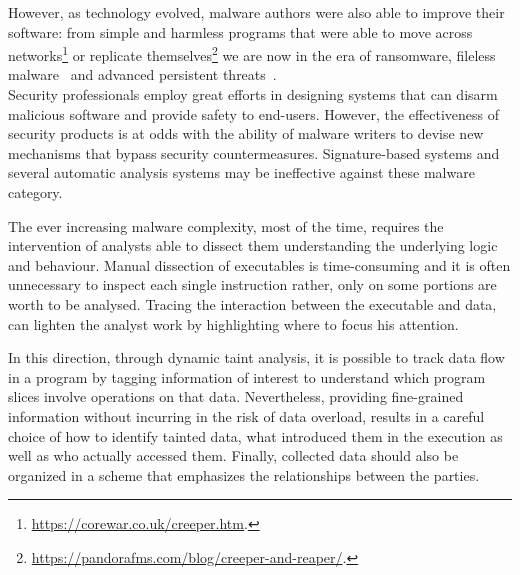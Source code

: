 \documentclass[LaM,binding=0.6cm]{sapthesis}
\begin{document}
However, as technology evolved, malware authors were also able to improve their software: from simple and harmless programs that were able to move across networks\footnote{\url{https://corewar.co.uk/creeper.htm}.} or replicate themselves\footnote{\url{https://pandorafms.com/blog/creeper-and-reaper/}.} we are now in the era of ransomware, fileless malware~\cite{alzurigrowth} 
and advanced persistent threats~\cite{virvilis2013big}.\\

Security professionals employ great efforts in designing systems that can disarm malicious software and provide safety to end-users. However, the effectiveness of security products is at odds with the ability of malware writers to devise new mechanisms that bypass security countermeasures. Signature-based systems and several automatic analysis systems may be ineffective against these malware category.

The ever increasing malware complexity, most of the time, requires the intervention of analysts able to dissect them understanding the underlying logic and behaviour. Manual dissection of executables is time-consuming and it is often unnecessary to inspect each single instruction rather, only on some portions are worth to be analysed. Tracing the interaction between the executable and data, can lighten the analyst work by highlighting where to focus his attention.

In this direction, through dynamic taint analysis, it is possible to track data flow in a program by tagging information of interest to understand which program slices involve operations on that data. Nevertheless, providing fine-grained information without incurring in the risk of data overload, results in a careful choice of how to identify tainted data, what introduced them in the execution as well as who actually accessed them. Finally, collected data should also be organized in a scheme that emphasizes the relationships between the parties.
\end{document}
